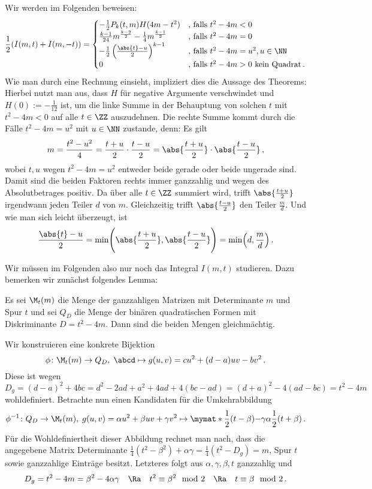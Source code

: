 \begin{bewe}
Wir werden im Folgenden beweisen:
\[
	\frac 12 (I(m,t) + I(m, -t)) = \begin{cases}
		- \frac 12 P_k(t,m) H(4m - t^2) &\text{, falls } t^2 - 4m < 0 \\
	\frac{k-1}{24} m^{\frac {k-2}2} - \frac 14 m^{\frac {k-1}2} &\text{, falls } t^2 - 4m = 0 \\
	- \frac 12 \left( \frac{\abs{t} - u}2 \right)^{k-1} &\text{, falls } t^2 - 4m = u^2, u \in \NN \\
	0 &\text{, falls } t^2 - 4m > 0 \text{ kein Quadrat} \,.
\end{cases}
\]
Wie man durch eine Rechnung einsieht, impliziert dies die Aussage des Theorems: Hierbei nutzt man aus, dass $H$ für negative Argumente verschwindet und $H(0) := - \frac 1{12}$ ist, um die linke Summe in der Behauptung von solchen $t$ mit $t^2 - 4m < 0$ auf alle $t \in \ZZ$ auszudehnen. Die rechte Summe kommt durch die Fälle $t^2 - 4m = u^2$ mit $u \in \NN$ zustande, denn: Es gilt
\[
	m = \frac {t^2 - u^2}4 = \frac {t+u}2 \cdot \frac {t-u}2 = \abs{\frac {t+u}2} \cdot \abs{\frac {t-u}2}
	\,,
\]
wobei $t, u$ wegen $t^2 - 4m = u^2$ entweder beide gerade oder beide ungerade sind. Damit sind die beiden Faktoren rechts immer ganzzahlig und wegen des Absolutbetrages positiv. Da über alle $t \in \ZZ$ summiert wird, trifft $\abs{\frac {t+u}2}$ irgendwann jeden Teiler $d$ von $m$. Gleichzeitig trifft $\abs{\frac {t-u}2}$ den Teiler $\frac md$. Und wie man sich leicht überzeugt, ist
\[
	\frac{\abs{t} - u}2 = \min \Biggl( \abs{\frac {t+u}2} ,\abs{\frac {t-u}2} \Biggr) = \min \Bigl( d, \frac md \Bigr)
	\,.
\]

Wir müssen im Folgenden also \glqq{}nur\grqq{} noch das Integral $I(m, t)$ studieren. Dazu bemerken wir zunächst folgendes Lemma:

\begin{lemm}\label{Mt(m)=QD}
Es sei $\M_t(m)$ die Menge der ganzzahligen Matrizen mit Determinante $m$ und Spur $t$ und sei $Q_D$ die Menge der binären quadratischen Formen mit Diskriminante $D = t^2 - 4m$. Dann sind die beiden Mengen gleichmächtig.
\end{lemm}

\begin{bewe}
Wir konstruieren eine konkrete Bijektion
\[
	\phi \colon \M_t (m) \to Q_D, \; \abcd \mapsto g(u, v) = cu^2 + (d-a)uv - bv^2
	\,.
\]
Diese ist wegen 
\[
	D_g = (d-a)^2 + 4bc = d^2 - 2ad + a^2 + 4ad + 4 (bc-ad) = (d+a)^2 - 4(ad-bc) = t^2 - 4m
\]
wohldefiniert. Betrachte nun einen Kandidaten für die Umkehrabbildung
\[
	\phi^{-1} \colon Q_D \to \M_t (m), \; g(u, v) = \alpha u^2 + \beta uv + \gamma v^2 \mapsto \mymat* {\frac 12 (t - \beta)} {-\gamma} \alpha {\frac 12(t + \beta)}
	\,.
\]
Für die Wohldefiniertheit dieser Abbildung rechnet man nach, dass die angegebene Matrix Determinante $\frac 14 (t^2 - \beta^2) + \alpha \gamma = \frac 14 (t^2 - D_g) = m$, Spur $t$ sowie ganzzahlige Einträge besitzt. Letzteres folgt aus $\alpha, \gamma, \beta, t$ ganzzahlig und
\[
	D_g = t^2 - 4m = \beta^2 - 4\alpha \gamma \quad \Ra \quad t^2 \equiv \beta^2 \mod 2 \quad \Ra \quad t \equiv \beta \mod 2
	\,.
\]


\end{bewe}
\end{bewe}
